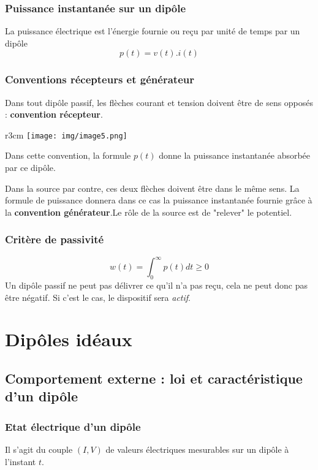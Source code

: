 \documentclass[british,french,11pt, a4paper, openany]{book}
\begin{document}
		\subsection{Puissance instantanée sur un dipôle}
		La puissance électrique est l'énergie fournie ou reçu par unité de temps par un dipôle
		\begin{equation}
		p(t) = v(t).i(t)
		\end{equation}
		
		\subsection{Conventions récepteurs et générateur}
		Dans tout dipôle passif, les flèches courant et tension doivent être de sens opposés : \textbf{convention récepteur}.\\
		\begin{wrapfigure}[8]{r}{3cm}
			\texttt{[image: img/image5.png]}
		\end{wrapfigure} Dans cette convention, la formule $p(t)$ donne la puissance instantanée absorbée par ce dipôle.
		
		Dans la source par contre, ces deux flèches doivent être dans le même sens. La formule de puissance donnera dans ce cas la puissance instantanée fournie grâce à la \textbf{convention générateur}.Le rôle de la source est de "relever" le potentiel.
		
		\subsection{Critère de passivité}
		\begin{equation}
		w(t) = \int_0^\infty p(t)dt \geq 0
		\end{equation}
		Un dipôle passif ne peut pas délivrer ce qu'il n'a pas reçu, cela ne peut donc pas être négatif. Si c'est le cas, le dispositif sera \textit{actif}.
		
		\chapter{Dipôles idéaux}
		
		\section{Comportement externe : loi et caractéristique d'un dipôle}
		\subsection{Etat électrique d'un dipôle}
		Il s'agit du couple $(I,V)$ de valeurs électriques mesurables sur un dipôle à l'instant $t$.
		
\end{document}
